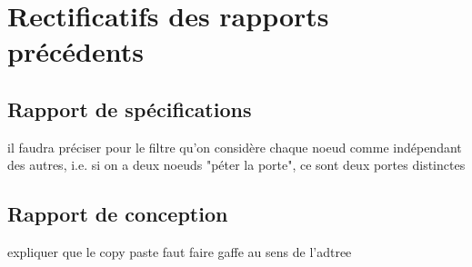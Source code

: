 \section{Rectificatifs des rapports précédents}
\subsection{Rapport de spécifications}
il faudra préciser pour le filtre qu'on considère chaque noeud comme indépendant des autres, i.e. si on a deux noeuds "péter la porte", ce sont deux portes distinctes

\subsection{Rapport de conception}
expliquer que le copy paste faut faire gaffe au sens de l'adtree